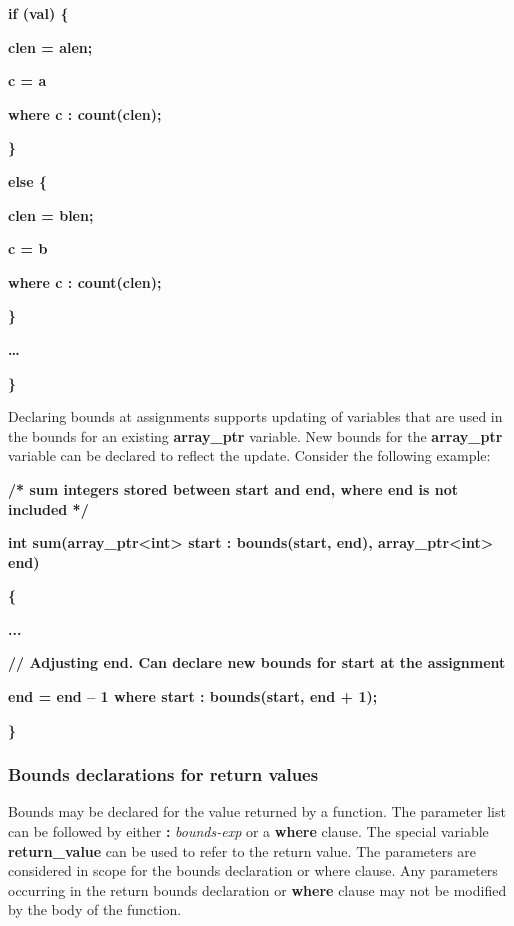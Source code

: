 \documentclass[]{article}
\begin{document}
\textbf{if (val) \{}

\textbf{clen = alen;}

\textbf{c = a}

\textbf{where c : count(clen);}

\textbf{\}}

\textbf{else \{}

\textbf{clen = blen;}

\textbf{c = b}

\textbf{where c : count(clen);}

\textbf{\} }

\textbf{\ldots{}}

\textbf{\}}

Declaring bounds at assignments supports updating of variables that are
used in the bounds for an existing \textbf{array\_ptr} variable. New
bounds for the \textbf{array\_ptr} variable can be declared to reflect
the update. Consider the following example:

\textbf{/* sum integers stored between start and end, where end is not
included */}

\textbf{int sum(array\_ptr\textless{}int\textgreater{} start :
bounds(start, end), array\_ptr\textless{}int\textgreater{} end)}

\textbf{\{ }

\textbf{...}

\textbf{// Adjusting end. Can declare new bounds for start at the
assignment}

\textbf{end = end -- 1 where start : bounds(start, end + 1);}

\textbf{\}}

\subsubsection{\texorpdfstring{\protect\hypertarget{ux5fToc435434931}{}{\protect\hypertarget{ux5fToc437460752}{}{\protect\hypertarget{ux5fToc440445430}{}{\protect\hypertarget{ux5fToc440449212}{}{\protect\hypertarget{ux5fToc440551862}{}{\protect\hypertarget{ux5fToc420589177}{}{\protect\hypertarget{ux5fToc422906968}{}{\protect\hypertarget{ux5fToc424307692}{}{}}}}}}}}Bounds
declarations for return
values}{Bounds declarations for return values}}\label{bounds-declarations-for-return-values}

Bounds may be declared for the value returned by a function. The
parameter list can be followed by either \textbf{:} \emph{bounds-exp} or
a \textbf{where} clause. The special variable \textbf{return\_value} can
be used to refer to the return value. The parameters are considered in
scope for the bounds declaration or where clause. Any parameters
occurring in the return bounds declaration or \textbf{where} clause may
not be modified by the body of the function.
\end{document}
